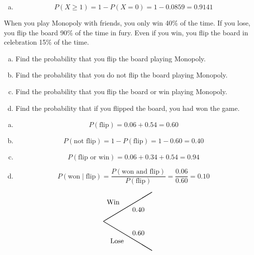 \documentclass[12pt,letterpaper]{exam}
\begin{document}
\begin{questions}
\begin{enumerate}[(a)]
\item 
	\[
	P(X \geq 1)= 1 - P(X= 0)= 1 - 0.0859= 0.9141
	\]
\end{enumerate}



\newpage
\question[15] When you play Monopoly with friends, you only win 40\% of the time. If you lose, you flip the board 90\% of the time in fury. Even if you win, you flip the board in celebration 15\% of the time.
	\begin{enumerate}[(a)]
	\item Find the probability that you flip the board playing Monopoly. 
	\item Find the probability that you do not flip the board playing Monopoly. 
	\item Find the probability that you flip the board or win playing Monopoly. 
	\item Find the probability that if you flipped the board, you had won the game. 
	\end{enumerate} \pspace

\sol 
\begin{enumerate}[(a)]
\item 
	\[
	P(\text{flip})= 0.06 + 0.54= 0.60
	\] \pspace

\item 
	\[
	P(\text{not flip})= 1 - P(\text{flip})= 1 - 0.60= 0.40
	\] \pspace

\item 
	\[
	P(\text{flip or win})= 0.06 + 0.34 + 0.54= 0.94
	\] \pspace

\item 
	\[
	P(\text{won} \;|\; \text{flip})= \dfrac{P(\text{won and flip})}{P(\text{flip})}= \dfrac{0.06}{0.60}= 0.10
	\]
\end{enumerate} \pspace \vfill

		\[
		\begin{tikzpicture}[scale= 1.0]
		\def\FirstUpLabel{Win}
		\def\FirstDownLabel{Lose}
		\def\SecondUpLabel{Flip}
		\def\SecondDownLabel{Not Flip}
		\def\Up{$0.40$}
		\def\Down{$0.60$}
		\def\UpUp{$0.15$}
		\def\UpDown{$0.85$}
		\def\DownUp{$0.90$}
		\def\DownDown{$0.10$}
		\def\first{$0.06$}
		\def\second{$0.34$}
		\def\third{$0.54$}
		\def\fourth{$0.06$}
		
		\node at (0.5,1) {\FirstUpLabel};	
		\node at (0.7,-1) {\FirstDownLabel};	
		\node at (1.8,0.6) {\Up};
		\node at (1.8,-0.6) {\Down};
		\draw[thick] (0,0) -- (2.5,1.5);
		\draw[thick] (0,0) -- (2.5,-1.5);
		

\end{tikzpicture}\]
\end{questions}
\end{document}
